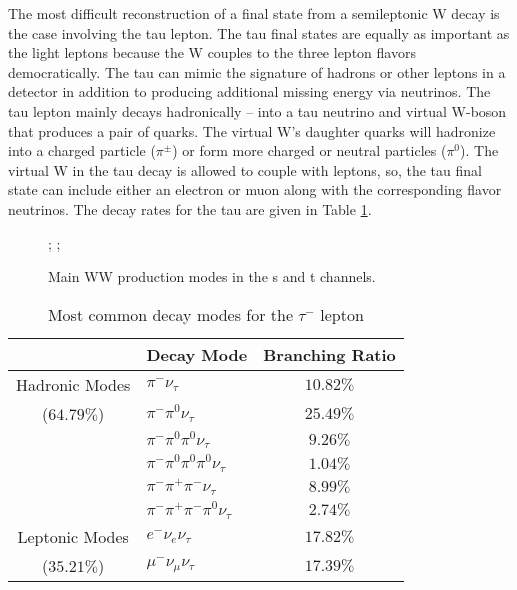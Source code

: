   The most difficult reconstruction of a final state from a semileptonic W decay is the case involving the tau lepton. The tau final states are equally as important as the light leptons because the W couples to the three lepton flavors democratically. The tau can mimic the signature of hadrons or other leptons in a detector in addition to producing additional missing energy via neutrinos.  The tau lepton mainly decays hadronically -- into a tau neutrino and virtual W-boson that produces a pair of quarks. The virtual W's daughter quarks will hadronize into a charged particle ($\pi^\pm$) or form more charged or neutral particles ($\pi^0$). The virtual W in the tau decay is allowed to couple with leptons, so, the tau final state can include either an electron or muon along with the corresponding flavor neutrinos. The decay rates for the tau are given in Table \ref{tab:taudecay}.
\begin{figure}
\centering
{};
    ;
\caption{\label{fig:wwdiag} Main WW production modes in the s and t channels. }
\end{figure}
\begin{table}
\centering
 \begin{tabular}{|c|l|c|} 
 
 \hline
       & Decay Mode & Branching Ratio  \\ \hline \hline
    Hadronic Modes  & $\pi^- \nu_\tau$  & $10.82\%$  \\
      	($64.79\%$) & $\pi^- \pi^0 \nu_\tau$ & $25.49\%$ \\
     				& $\pi^- \pi^0 \pi^0 \nu_\tau$  & $9.26\%$  \\
     				& $\pi^- \pi^0 \pi^0 \pi^0 \nu_\tau$  & $1.04\%$   \\
      				& $\pi^- \pi^+ \pi^- \nu_\tau$  & $8.99\%$      \\ 
      				& $\pi^- \pi^+ \pi^- \pi^0 \nu_\tau$  & $2.74\%$  \\ \hline
    			    
    Leptonic Modes  & $e^- \nu_e \nu_\tau$ & $17.82\%$   \\
    	($35.21\%$)	& $\mu^- \nu_\mu \nu_\tau $  & $17.39\%$      \\ \midrule \hline
      				
     				
\end{tabular}
        \caption{\label{tab:taudecay}Most common decay modes for the $\tau^-$ lepton \cite{pdg}}
\end{table}
       
